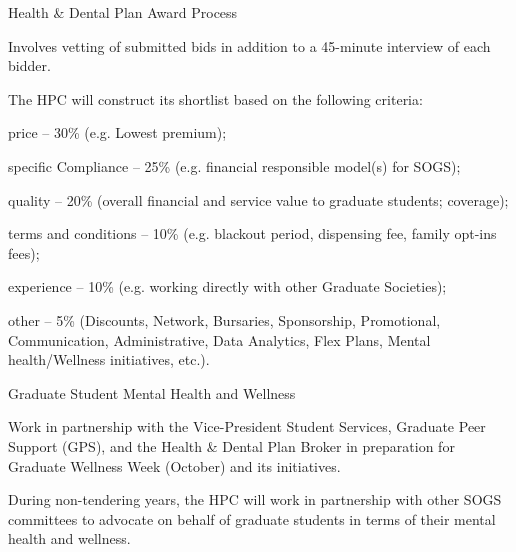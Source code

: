 \begin{longenum}[ label*=\thesubsection.\arabic*., align=left]
\begin{longenum}[label*=\arabic*., align=left]
	\item Health \& Dental Plan Award Process
		\begin{longenum}[label*=\arabic*., align=left]
		\item Involves vetting of submitted bids in addition to a 45-minute interview of each bidder.
		\item The HPC will construct its shortlist based on the following criteria:
			\begin{longenum}[label*=\arabic*., align=left]
			\item price -- 30\% (e.g. Lowest premium);
			\item specific Compliance -- 25\% (e.g. financial responsible model(s) for SOGS);
			\item quality -- 20\% (overall financial and service value to graduate students; coverage);
			\item terms and conditions -- 10\% (e.g. blackout period, dispensing fee, family opt-ins fees);
			\item experience -- 10\% (e.g. working directly with other Graduate Societies);
			\item other -- 5\% (Discounts, Network, Bursaries, Sponsorship, Promotional,
Communication, Administrative, Data Analytics, Flex Plans, Mental health/Wellness initiatives, etc.).
			\end{longenum}
		\end{longenum}
	\end{longenum}
\item Graduate Student Mental Health and Wellness
	\begin{longenum}[label*=\arabic*., align=left]
	\item Work in partnership with the Vice-President Student Services, Graduate Peer Support (GPS), and the Health
	\& Dental Plan Broker in preparation for Graduate Wellness Week (October) and its initiatives.
	\item During non-tendering years, the HPC will work in partnership with other SOGS committees to advocate on
	behalf of graduate students in terms of their mental health and wellness.
	\end{longenum}
\end{longenum}